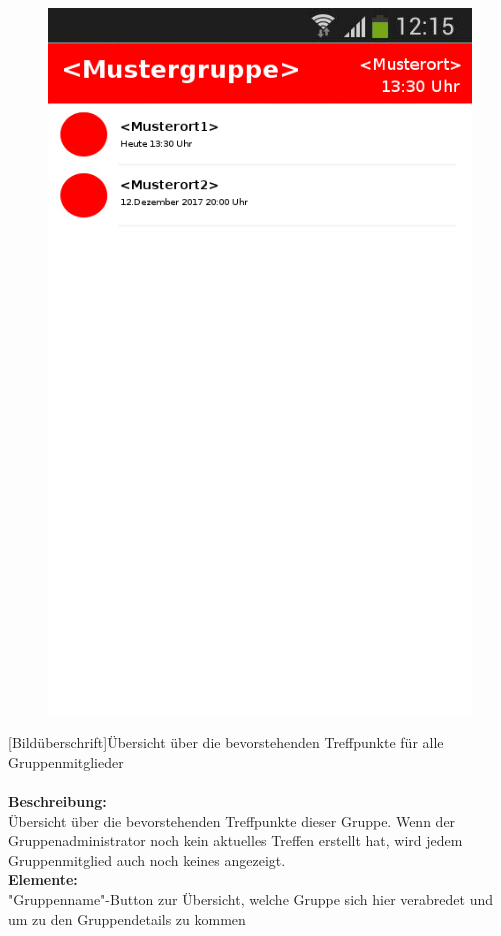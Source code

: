 \begin{figure}
	\includegraphics[scale =1]{resources/images/treffpunktuebersicht.png}
\end{figure}
[Bildüberschrift]Übersicht über die bevorstehenden Treffpunkte für alle Gruppenmitglieder\\ \\
\textbf{Beschreibung:}\\
Übersicht über die bevorstehenden Treffpunkte dieser Gruppe. Wenn der Gruppenadministrator noch kein aktuelles Treffen erstellt hat, wird jedem Gruppenmitglied auch noch keines angezeigt.\\
\textbf{Elemente:}\\
"Gruppenname"-Button zur Übersicht, welche Gruppe sich hier verabredet und um zu den Gruppendetails zu kommen\\
